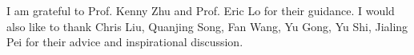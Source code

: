 \begin{thanks}

I am grateful to Prof. Kenny Zhu and Prof. Eric Lo for their guidance. I
would also like to thank Chris Liu, Quanjing Song, Fan Wang, Yu Gong, Yu
Shi, Jialing Pei for their advice and inspirational discussion.

\end{thanks}
